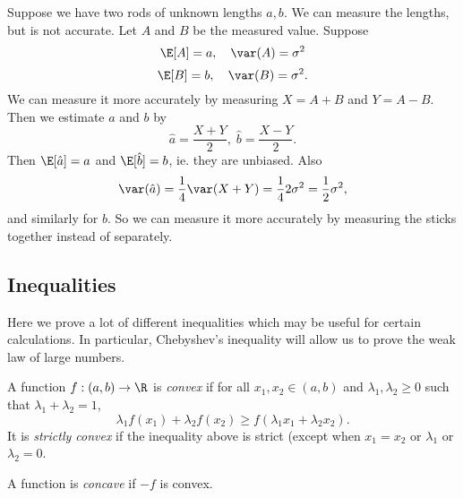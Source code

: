 \documentclass[a4paper]{article}
\begin{document}
\begin{eg}
  Suppose we have two rods of unknown lengths $a, b$. We can measure the lengths, but is not accurate. Let $A$ and $B$ be the measured value. Suppose
  \[
    \E[A] = a,\quad \var(A) = \sigma^2
  \]
  \[
    \E[B] = b, \quad \var(B) = \sigma^2.
  \]
  We can measure it more accurately by measuring $X = A + B$ and $Y = A - B$. Then we estimate $a$ and $b$ by
  \[
    \hat{a} = \frac{X + Y}{2},\; \hat{b} = \frac{X - Y}{2}.
  \]
  Then $\E[\hat{a}] = a$ and $\E[\hat{b}] = b$, ie. they are unbiased. Also
  \[
    \var (\hat{a}) = \frac{1}{4}\var(X + Y) = \frac{1}{4}2\sigma^2 = \frac{1}{2}\sigma^2,
  \]
  and similarly for $b$. So we can measure it more accurately by measuring the sticks together instead of separately.
\end{eg}

\subsection{Inequalities}
Here we prove a lot of different inequalities which may be useful for certain calculations. In particular, Chebyshev's inequality will allow us to prove the weak law of large numbers.

\begin{defi}
  A function $f: (a, b) \to \R$ is \emph{convex} if for all $x_1, x_2\in (a, b)$ and $\lambda_1, \lambda_2 \geq 0$ such that $\lambda_1 + \lambda_2 = 1$,\[
    \lambda_1f(x_1) + \lambda_2 f(x_2) \geq f(\lambda_1x_1 + \lambda_2 x_2).
  \]
  It is \emph{strictly convex} if the inequality above is strict (except when $x_1 = x_2$ or $\lambda_1$ or $\lambda_2 = 0$.
  \begin{center}
  \end{center}
  A function is \emph{concave} if $-f$ is convex.
\end{defi}
\end{document}
